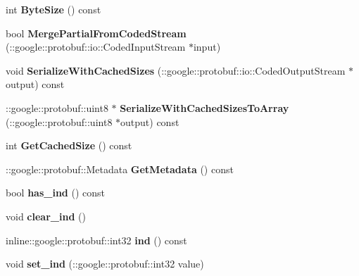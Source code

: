 \begin{DoxyCompactItemize}
\item 
\hypertarget{classTagging_a6c2f74cb255bb4913fd279c6f3254729}{
int {\bfseries ByteSize} () const }
\label{classTagging_a6c2f74cb255bb4913fd279c6f3254729}

\item 
\hypertarget{classTagging_a1c8cf78b674f62c201f31e2b6ad721f2}{
bool {\bfseries MergePartialFromCodedStream} (::google::protobuf::io::CodedInputStream $\ast$input)}
\label{classTagging_a1c8cf78b674f62c201f31e2b6ad721f2}

\item 
\hypertarget{classTagging_afbd4d173621ed8cfc227dbcceec933d6}{
void {\bfseries SerializeWithCachedSizes} (::google::protobuf::io::CodedOutputStream $\ast$output) const }
\label{classTagging_afbd4d173621ed8cfc227dbcceec933d6}

\item 
\hypertarget{classTagging_a758bb0408c843056d4c70b917d02509b}{
::google::protobuf::uint8 $\ast$ {\bfseries SerializeWithCachedSizesToArray} (::google::protobuf::uint8 $\ast$output) const }
\label{classTagging_a758bb0408c843056d4c70b917d02509b}

\item 
\hypertarget{classTagging_a4661d58542895ed97b5e55ffb7d19f0c}{
int {\bfseries GetCachedSize} () const }
\label{classTagging_a4661d58542895ed97b5e55ffb7d19f0c}

\item 
\hypertarget{classTagging_a7d324ff2794e15d2c55c7238e173b520}{
::google::protobuf::Metadata {\bfseries GetMetadata} () const }
\label{classTagging_a7d324ff2794e15d2c55c7238e173b520}

\item 
\hypertarget{classTagging_a7e57b22b3a2162e380feae08233ee3a9}{
bool {\bfseries has\_\-ind} () const }
\label{classTagging_a7e57b22b3a2162e380feae08233ee3a9}

\item 
\hypertarget{classTagging_ad56efb939f57d519f4585a537c3d5266}{
void {\bfseries clear\_\-ind} ()}
\label{classTagging_ad56efb939f57d519f4585a537c3d5266}

\item 
\hypertarget{classTagging_a11022a65eecc2f9f771efb51e3414c59}{
inline::google::protobuf::int32 {\bfseries ind} () const }
\label{classTagging_a11022a65eecc2f9f771efb51e3414c59}

\item 
\hypertarget{classTagging_a34538a14f1727c2c15ddf43f5419f61b}{
void {\bfseries set\_\-ind} (::google::protobuf::int32 value)}
\label{classTagging_a34538a14f1727c2c15ddf43f5419f61b}


\end{DoxyCompactItemize}
